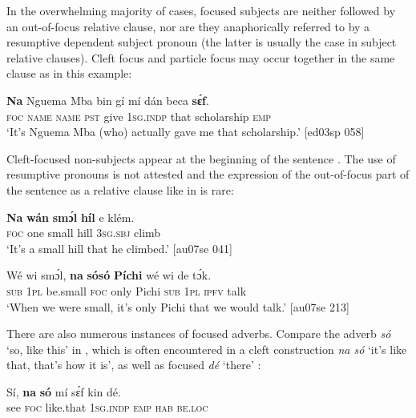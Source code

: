 In the overwhelming majority of cases, focused subjects are neither followed by an out-of-focus relative clause, nor are they anaphorically referred to by a resumptive dependent subject pronoun (the latter is usually the case in subject relative clauses). Cleft focus and particle focus may occur together in the same clause as in this example: 



\ea%
    \label{ex:key:701}
    \gll \textbf{Na}  Nguema  Mba    bin  gí  mí    dán    beca      \textbf{sɛ́f}.\\
\textsc{foc}  \textsc{name}  \textsc{name}  \textsc{pst}  give  \textsc{1sg.indp}  that    scholarship  \textsc{emp}\\

\glt \textsc{‘}It’s Nguema Mba (who) actually gave me that scholarship.’ [ed03sp 058]
\z

Cleft-focused non-subjects appear at the beginning of the sentence . The use of resumptive pronouns is not attested and the expression of the out-of-focus part of the sentence as a relative clause like in  is rare: 


\ea%
    \label{ex:key:702}
    \gll \textbf{Na}  \textbf{wán}    \textbf{smɔ́l}  \textbf{híl}  e    klém.\\
\textsc{foc}  one    small  hill  \textsc{3sg.sbj}  climb\\

\glt ‘It’s a small hill that he climbed.’ [au07se 041]
\z


\ea%
    \label{ex:key:703}
    \gll Wé  wi  smɔ́l,  \textbf{na}  \textbf{sósó}    \textbf{Píchi}  wé  wi  de  tɔ́k.\\
\textsc{sub}  \textsc{1pl}  be.small  \textsc{foc}  only    Pichi  \textsc{sub}  \textsc{1pl}  \textsc{ipfv}  talk\\

\glt ‘When we were small, it’s only Pichi that we would talk.’ [au07se 213]
\z

There are also numerous instances of focused adverbs. Compare the adverb \textit{só} ‘so, like this’ in , which is often encountered in a cleft construction \textit{na só} ‘it’s like that, that’s how it is’, as well as focused \textit{dé} ‘there’ : 


\ea%
    \label{ex:key:704}
    \gll Sí,  \textbf{na}  \textbf{só}    mí    sɛ́f  kin  dé.\\
see  \textsc{foc}  like.that  \textsc{1sg.indp}  \textsc{emp}  \textsc{hab}  \textsc{be.loc}\\

